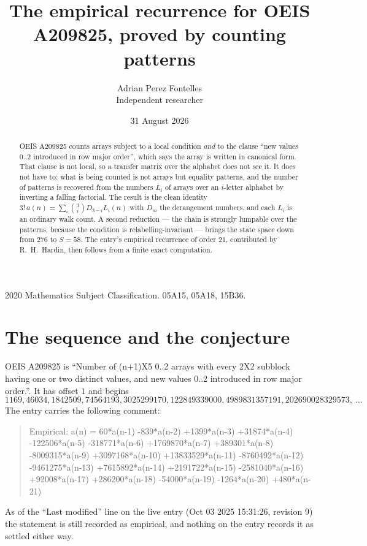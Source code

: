 \documentclass[11pt,a4paper]{article}
\title{The empirical recurrence for OEIS A209825, proved by counting patterns}
\author{Adrian Perez Fontelles\\ \small Independent researcher}
\date{31 August 2026}
\theoremstyle{plain}
\theoremstyle{definition}
\begin{document}
\maketitle

\begin{abstract}
OEIS A209825 counts arrays subject to a local condition \emph{and} to the clause ``new values
$0..2$ introduced in row major order'', which says the array is written in canonical
form. That clause is not local, so a transfer matrix over the alphabet does not see it. It
does not have to: what is being counted is not arrays but equality patterns, and the number
of patterns is recovered from the numbers $L_i$ of arrays over an $i$-letter alphabet by
inverting a falling factorial. The result is the clean identity
$3!\,a(n)=\sum_i\binom{3}{i}D_{3-i}L_i(n)$ with $D_m$ the derangement numbers,
and each $L_i$ is an ordinary walk count. A second reduction --- the chain is strongly
lumpable over the patterns, because the condition is relabelling-invariant --- brings the
state space down from $276$ to $S=58$. The entry's empirical recurrence of order
$21$, contributed by R.~H.~Hardin, then follows from a finite exact computation.
\end{abstract}

\noindent\small 2020 Mathematics Subject Classification. 05A15, 05A18, 15B36.\normalsize

\section{The sequence and the conjecture}

OEIS A209825 is ``Number of (n+1)X5 0..2 arrays with every 2X2 subblock having one or two distinct values, and new values 0..2 introduced in row major order.''. It has offset $1$ and begins
\[
1169, 46034, 1842509, 74564193, 3025299170, 122849339000, 4989831357191, 202690028329573,\ \dots
\]
The entry carries the following comment:
\begin{quote}\small
Empirical: a(n) = 60*a(n-1) -839*a(n-2) +1399*a(n-3) +31874*a(n-4) -122506*a(n-5) -318771*a(n-6) +1769870*a(n-7) +389301*a(n-8) -8009315*a(n-9) +3097168*a(n-10) +13833529*a(n-11) -8760492*a(n-12) -9461275*a(n-13) +7615892*a(n-14) +2191722*a(n-15) -2581040*a(n-16) +92008*a(n-17) +286200*a(n-18) -54000*a(n-19) -1264*a(n-20) +480*a(n-21)
\end{quote}
As of the ``Last modified'' line on the live entry (Oct 03 2025 15:31:26, revision 9) the statement is
still recorded as empirical, and nothing on the entry records it as settled either way.
\end{document}
